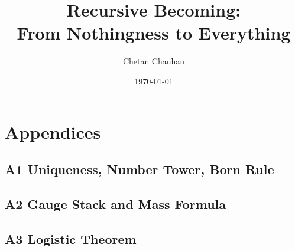 \documentclass[11pt]{article}
\title{Recursive Becoming:\\From Nothingness to Everything}
\author{Chetan Chauhan}
\date{\today}
\begin{document}
\maketitle


\tableofcontents
\clearpage

\FloatBarrier

\FloatBarrier

\FloatBarrier

\FloatBarrier

\FloatBarrier

\FloatBarrier

\FloatBarrier

\FloatBarrier

\FloatBarrier

\FloatBarrier

\FloatBarrier

\FloatBarrier

\FloatBarrier

\FloatBarrier

\FloatBarrier

\FloatBarrier


\appendix
\section*{Appendices}

\subsection*{A1 \quad Uniqueness, Number Tower, Born Rule}




\subsection*{A2 \quad Gauge Stack and Mass Formula}



\subsection*{A3 \quad Logistic Theorem}


\printbibliography
\end{document}
